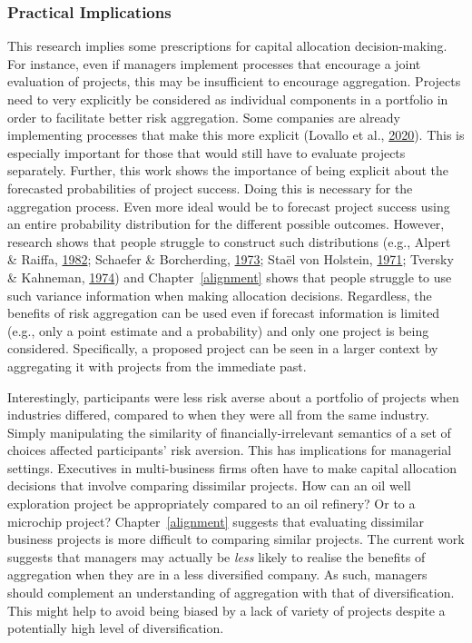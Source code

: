 \documentclass[
  english,
  man, donotrepeattitle,floatsintext]{apa7}
\theoremstyle{definition}
\theoremstyle{definition}
\theoremstyle{definition}
\theoremstyle{definition}
\theoremstyle{remark}
\begin{document}
\hypertarget{practical-implications}{%
\subsubsection{Practical Implications}\label{practical-implications}}

This research implies some prescriptions for capital allocation decision-making.
For instance, even if managers implement processes that encourage a joint
evaluation of projects, this may be insufficient to encourage aggregation.
Projects need to very explicitly be considered as individual components in a
portfolio in order to facilitate better risk aggregation. Some companies are
already implementing processes that make this more explicit (Lovallo et al., \protect\hyperlink{ref-lovallo2020}{2020}). This
is especially important for those that would still have to evaluate projects
separately. Further, this work shows the importance of being explicit about the
forecasted probabilities of project success. Doing this is necessary for the
aggregation process. Even more ideal would be to forecast project success using
an entire probability distribution for the different possible outcomes. However,
research shows that people struggle to construct such distributions (e.g., Alpert \& Raiffa, \protect\hyperlink{ref-alpert1982}{1982}; Schaefer \& Borcherding, \protect\hyperlink{ref-schaefer1973}{1973}; Staël von Holstein, \protect\hyperlink{ref-staelvonholstein1971}{1971}; Tversky \& Kahneman, \protect\hyperlink{ref-tversky1974}{1974}) and
Chapter~\ref{alignment} shows that people struggle to use such variance
information when making allocation decisions. Regardless, the benefits of risk
aggregation can be used even if forecast information is limited (e.g., only a
point estimate and a probability) and only one project is being considered.
Specifically, a proposed project can be seen in a larger context by aggregating
it with projects from the immediate past.

Interestingly, participants were less risk averse about a portfolio of projects
when industries differed, compared to when they were all from the same industry.
Simply manipulating the similarity of financially-irrelevant semantics of a set
of choices affected participants' risk aversion. This has implications for
managerial settings. Executives in multi-business firms often have to make
capital allocation decisions that involve comparing dissimilar projects. How can
an oil well exploration project be appropriately compared to an oil refinery? Or
to a microchip project? Chapter~\ref{alignment} suggests that evaluating
dissimilar business projects is more difficult to comparing similar projects.
The current work suggests that managers may actually be \emph{less} likely to realise
the benefits of aggregation when they are in a less diversified company. As
such, managers should complement an understanding of aggregation with that of
diversification. This might help to avoid being biased by a lack of variety of
projects despite a potentially high level of diversification.
\end{document}
